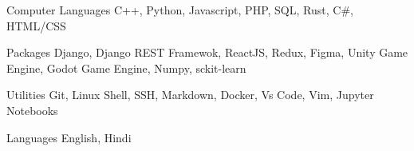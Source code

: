 

\begin{cvskills}

  \cvskill
    {Computer Languages} %
    {C++, Python, Javascript, PHP, SQL, Rust, C\#, HTML/CSS} %

  \cvskill
    {Packages} %
    {Django, Django REST Framewok, ReactJS, Redux, Figma, Unity Game Engine, Godot Game Engine, Numpy, sckit-learn} %
    

  \cvskill
    {Utilities} %
    {Git, Linux Shell, SSH, Markdown, Docker, Vs Code, Vim, Jupyter Notebooks} %


  \cvskill
{Languages} %
{English, Hindi} %




\end{cvskills}